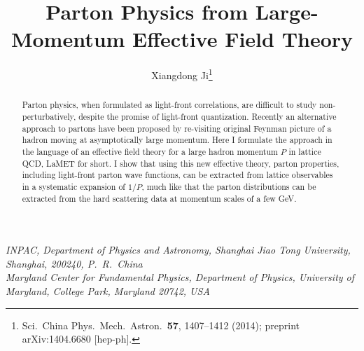 \documentclass[11pt]{article}
\title{\bfseries Parton Physics from Large-Momentum Effective Field Theory}
\author{Xiangdong Ji\thanks{Sci.\ China Phys.\ Mech.\ Astron.\ \textbf{57}, 1407--1412 (2014); preprint arXiv:1404.6680 [hep-ph].}}
\date{}
\begin{document}
\maketitle
\vspace{-2.5em}
\begin{center}\itshape
INPAC, Department of Physics and Astronomy, Shanghai Jiao Tong University,
Shanghai, 200240, P.\ R.\ China\\
Maryland Center for Fundamental Physics, Department of Physics,
University of Maryland, College Park, Maryland 20742, USA
\end{center}

\begin{abstract}
Parton physics, when formulated as
light-front correlations, are difficult to study non-perturbatively, despite the promise
of light-front quantization. Recently an alternative approach to partons have been
proposed by re-visiting original Feynman picture of a hadron moving at asymptotically large
momentum. Here I formulate the approach in the language of an effective field theory for a large hadron momentum
$P$ in lattice QCD, LaMET for short. I show that using this new effective theory, parton properties, including
light-front parton wave functions, can be extracted from lattice observables in a
systematic expansion of $1/P$, much like that the parton distributions can be extracted from the
hard scattering data at momentum scales of a few GeV.
\end{abstract}



\end{document}
